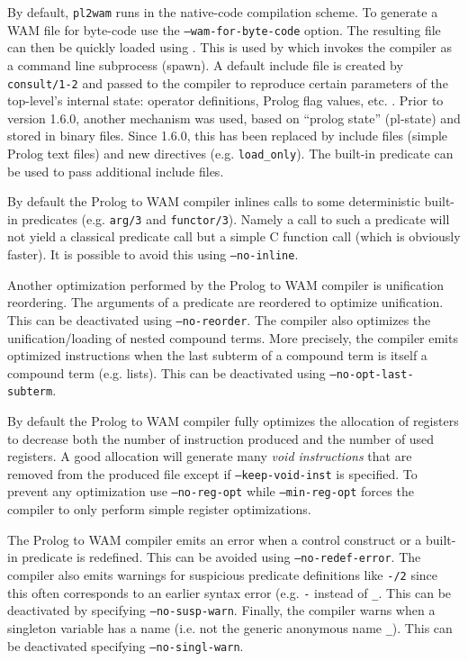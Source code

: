 By default, \texttt{pl2wam} runs in the native-code compilation scheme. To
generate a WAM file for byte-code use the \texttt{--wam-for-byte-code}
option. The resulting file can then be quickly loaded using 
. This is used by  which invokes the compiler
as a command line subprocess (spawn). A default include file is created by
\texttt{consult/1-2} and passed to the compiler to reproduce certain
parameters of the top-level's internal state: operator definitions, Prolog
flag values, etc. . Prior to version 1.6.0, another
mechanism was used, based on ``prolog state'' (pl-state) and stored in binary
files. Since 1.6.0, this has been replaced by include files (simple Prolog
text files) and new directives (e.g. \texttt{load\_only}). The built-in
predicate  can be used to pass additional include files.

By default the Prolog to WAM compiler inlines calls to some deterministic
built-in predicates (e.g. \texttt{arg/3} and \texttt{functor/3}). Namely a
call to such a predicate will not yield a classical predicate call but a
simple C function call (which is obviously faster). It is possible to avoid
this using \texttt{--no-inline}.

Another optimization performed by the Prolog to WAM compiler is unification
reordering. The arguments of a predicate are reordered to optimize
unification. This can be deactivated using \texttt{--no-reorder}. The
compiler also optimizes the unification/loading of nested compound terms.
More precisely, the compiler emits optimized instructions when the last
subterm of a compound term is itself a compound term (e.g. lists). This can
be deactivated using \texttt{--no-opt-last-subterm}.

By default the Prolog to WAM compiler fully optimizes the allocation of
registers to decrease both the number of instruction produced and the number
of used registers. A good allocation will generate many \emph{void
instructions} that are removed from the produced file except if
\texttt{--keep-void-inst} is specified. To prevent any optimization use
\texttt{--no-reg-opt} while \texttt{--min-reg-opt} forces the compiler to
only perform simple register optimizations.

The Prolog to WAM compiler emits an error when a control construct or a
built-in predicate is redefined. This can be avoided using
\texttt{--no-redef-error}. The compiler also emits warnings for suspicious
predicate definitions like \texttt{-/2} since this often corresponds to an
earlier syntax error (e.g. \texttt{-} instead of \texttt{\_}. This can be
deactivated by specifying \texttt{--no-susp-warn}. Finally, the compiler
warns when a singleton variable has a name (i.e. not the generic anonymous
name \texttt{\_}). This can be deactivated specifying
\texttt{--no-singl-warn}.


